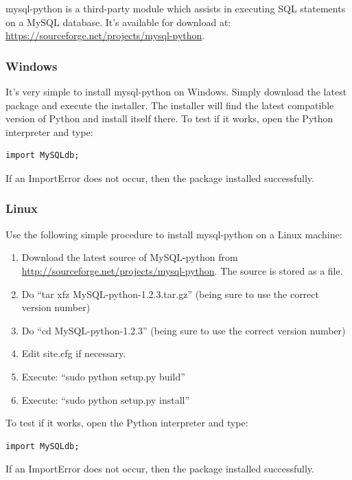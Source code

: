 mysql-python is a third-party module which assists in executing SQL statements on a MySQL database. It's available for download at: \url{https://sourceforge.net/projects/mysql-python}.

\subsubsection*{Windows}

It's very simple to install mysql-python on Windows. Simply download the latest package and execute the installer. The installer will find the latest compatible version of Python and install itself there. To test if it works, open the Python interpreter and type:

\begin{lstlisting}
import MySQLdb;
\end{lstlisting}

If an ImportError does not occur, then the package installed successfully.

\subsubsection*{Linux}

Use the following simple procedure to install mysql-python on a Linux machine:

\begin{enumerate}
\item Download the latest source of MySQL-python from \url{http://sourceforge.net/projects/mysql-python}. The source is stored as a  file.
\item Do ``tar xfz MySQL-python-1.2.3.tar.gz'' (being sure to use the correct version number)
\item Do ``cd MySQL-python-1.2.3'' (being sure to use the correct version number)
\item Edit site.cfg if necessary.
\item Execute: ``sudo python setup.py build''
\item Execute: ``sudo python setup.py install''
\end{enumerate}

To test if it works, open the Python interpreter and type:

\begin{lstlisting}
import MySQLdb;
\end{lstlisting}

If an ImportError does not occur, then the package installed successfully.